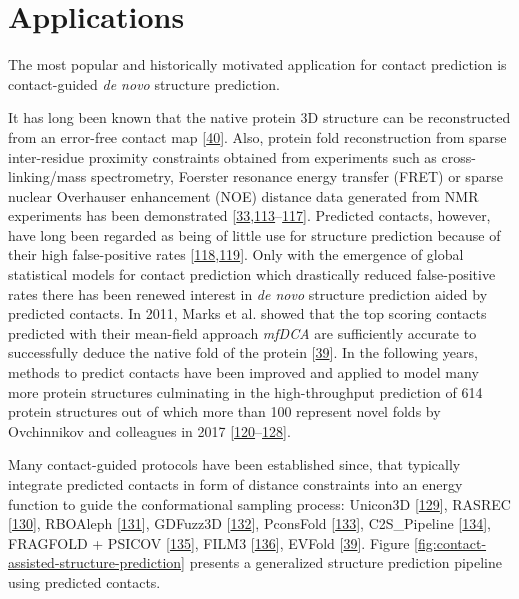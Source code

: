 \documentclass[11pt,a4paper,twoside]{book}
\theoremstyle{definition}
\theoremstyle{definition}
\theoremstyle{remark}
\begin{document}
\section{Applications}\label{application-contact-prediction}

The most popular and historically motivated application for contact
prediction is contact-guided \emph{de novo} structure prediction.

It has long been known that the native protein 3D structure can be
reconstructed from an error-free contact map
{[}\protect\hyperlink{ref-Vendruscolo1997}{40}{]}. Also, protein fold
reconstruction from sparse inter-residue proximity constraints obtained
from experiments such as cross-linking/mass spectrometry, Foerster
resonance energy transfer (FRET) or sparse nuclear Overhauser
enhancement (NOE) distance data generated from NMR experiments has been
demonstrated
{[}\protect\hyperlink{ref-Li2004}{33},\protect\hyperlink{ref-Yu2013}{113}--\protect\hyperlink{ref-Aszodi1995a}{117}{]}.
Predicted contacts, however, have long been regarded as being of little
use for structure prediction because of their high false-positive rates
{[}\protect\hyperlink{ref-Wu2011}{118},\protect\hyperlink{ref-Tress2010}{119}{]}.
Only with the emergence of global statistical models for contact
prediction which drastically reduced false-positive rates there has been
renewed interest in \emph{de novo} structure prediction aided by
predicted contacts. In 2011, Marks et al. showed that the top scoring
contacts predicted with their mean-field approach \emph{mfDCA} are
sufficiently accurate to successfully deduce the native fold of the
protein {[}\protect\hyperlink{ref-Marks2011}{39}{]}. In the following
years, methods to predict contacts have been improved and applied to
model many more protein structures culminating in the high-throughput
prediction of 614 protein structures out of which more than 100
represent novel folds by Ovchinnikov and colleagues in 2017
{[}\protect\hyperlink{ref-Hopf2012}{120}--\protect\hyperlink{ref-Ovchinnikov2017}{128}{]}.

Many contact-guided protocols have been established since, that
typically integrate predicted contacts in form of distance constraints
into an energy function to guide the conformational sampling process:
Unicon3D {[}\protect\hyperlink{ref-Bhattacharya2016}{129}{]}, RASREC
{[}\protect\hyperlink{ref-Braun2015}{130}{]}, RBOAleph
{[}\protect\hyperlink{ref-Mabrouk2015a}{131}{]}, GDFuzz3D
{[}\protect\hyperlink{ref-Pietal2015a}{132}{]}, PconsFold
{[}\protect\hyperlink{ref-Michel2014}{133}{]}, C2S\_Pipeline
{[}\protect\hyperlink{ref-Konopka2014}{134}{]}, FRAGFOLD + PSICOV
{[}\protect\hyperlink{ref-Kosciolek2014}{135}{]}, FILM3
{[}\protect\hyperlink{ref-Nugent2012}{136}{]}, EVFold
{[}\protect\hyperlink{ref-Marks2011}{39}{]}. Figure
\ref{fig:contact-assisted-structure-prediction} presents a generalized
structure prediction pipeline using predicted contacts.
\end{document}
